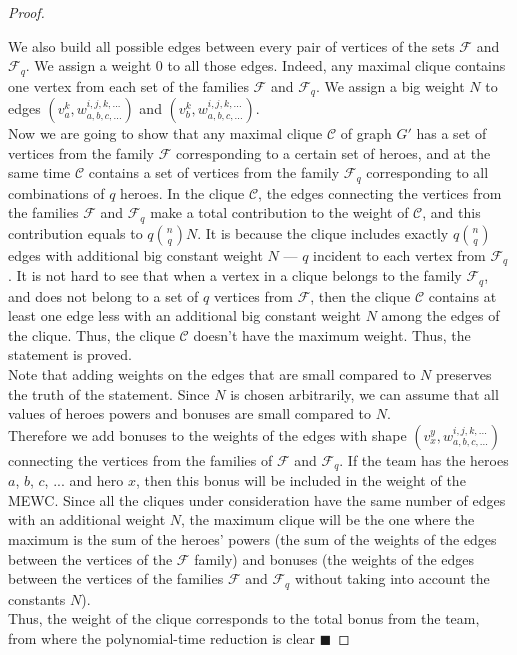 \documentclass[smallextended]{svjour3}       %
\begin{document}
\begin{proof}
\begin{itemize}
    \end {itemize}
    We also build all possible edges between every pair of vertices of the sets $ \mathcal{F} $ and $ \mathcal{F}_q $. We assign a weight $0$ to all those edges. Indeed, any maximal clique contains one vertex from each set of the families $\mathcal{F}$ and $\mathcal{F}_q$.
    We assign a big weight $ N $ to edges $ (v_a^k, w_{a, b, c, ...}^ {i, j, k, ...}) $ and $ (v_b^k, w_{a, b, c , ...}^{i, j, k, ...}) $. \\
    Now we are going to show that any maximal clique $\mathcal{C}$ of graph $G'$ has a set of vertices from the family $\mathcal{F}$ corresponding to a certain set of heroes, and at the same time $\mathcal{C}$ contains a set of vertices from the family $ \mathcal{F}_q $ corresponding to all combinations of $q$ heroes. In the clique $\mathcal{C}$, the edges connecting the vertices from the families $ \mathcal{F} $ and $ \mathcal{F}_q $ make a total contribution to the weight of $\mathcal{C}$, and this contribution equals to $ q \binom{n}{q} N $. It is because the clique includes exactly $ q \binom{n}{q} $ edges with additional big constant weight $N$ --- $q$ incident to each vertex from $ \mathcal {F}_q $.  It is not hard to see that when a vertex in a clique belongs to the family $ \mathcal{F}_q $, and does not belong to a set of $q$ vertices from $ \mathcal {F} $, then the clique $\mathcal{C}$ contains at least one edge less with an additional big constant weight $ N $ among the edges of the clique. Thus, the clique $\mathcal{C}$ doesn't have the maximum weight. Thus, the statement is proved. \\
    Note that adding weights on the edges that are small compared to $N$ preserves the truth of the statement. Since $N$ is chosen arbitrarily, we can assume that all values of heroes powers and bonuses are small compared to $N$.\\
	Therefore we add bonuses to the weights of the edges with shape $ (v_x^{y}, w_{a, b, c, ...}^{i, j, k, ...}) $ connecting the vertices from the families of $\mathcal{F} $ and $ \mathcal{F}_q $. If the team has the heroes $a$, $b$, $c$, ... and hero $x$, then this bonus will be included in the weight of the MEWC. Since all the cliques under consideration have the same number of edges with an additional weight $N$, the maximum clique will be the one where the maximum is the sum of the heroes' powers (the sum of the weights of the edges between the vertices of the $ \mathcal{F} $ family) and bonuses (the weights of the edges between the vertices of the families $ \mathcal{F} $ and $ \mathcal {F}_q $ without taking into account the constants $ N $).\\
Thus, the weight of the clique corresponds to the total bonus from the team, from where the polynomial-time reduction is clear    $\blacksquare$
\end{proof}
\end{document}
